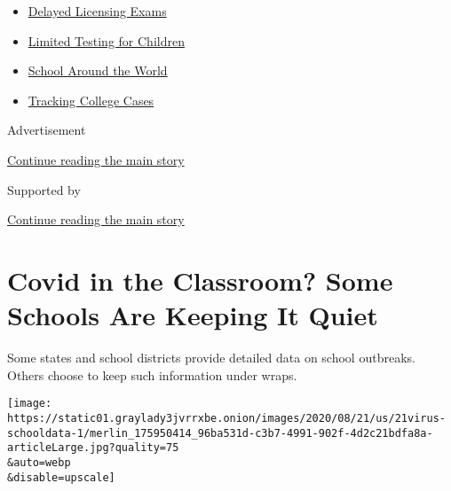 \begin{itemize}
\tightlist
\item
  \href{https://www.nytimes3xbfgragh.onion/2020/09/04/us/bar-exam-coronavirus.html?name=styln-coronavirus-schools-reopening\&region=TOP_BANNER\&block=storyline_menu_recirc\&action=click\&pgtype=Article\&impression_id=78b271e1-f299-11ea-a3f6-692f6f3812c0\&variant=undefined}{Delayed
  Licensing Exams}
\item
  \href{https://www.nytimes3xbfgragh.onion/2020/09/08/upshot/children-testing-shortfalls-virus.html?name=styln-coronavirus-schools-reopening\&region=TOP_BANNER\&block=storyline_menu_recirc\&action=click\&pgtype=Article\&impression_id=78b298f0-f299-11ea-a3f6-692f6f3812c0\&variant=undefined}{Limited
  Testing for Children}
\item
  \href{https://www.nytimes3xbfgragh.onion/2020/09/01/world/schools-reopen-globe-students.html?name=styln-coronavirus-schools-reopening\&region=TOP_BANNER\&block=storyline_menu_recirc\&action=click\&pgtype=Article\&impression_id=78b298f1-f299-11ea-a3f6-692f6f3812c0\&variant=undefined}{School
  Around the World}
\item
  \href{https://www.nytimes3xbfgragh.onion/interactive/2020/us/covid-college-cases-tracker.html?name=styln-coronavirus-schools-reopening\&region=TOP_BANNER\&block=storyline_menu_recirc\&action=click\&pgtype=Article\&impression_id=78b298f2-f299-11ea-a3f6-692f6f3812c0\&variant=undefined}{Tracking
  College Cases}
\end{itemize}

Advertisement

\protect\hyperlink{after-top}{Continue reading the main story}

Supported by

\protect\hyperlink{after-sponsor}{Continue reading the main story}

\hypertarget{covid-in-the-classroom-some-schools-are-keeping-it-quiet}{%
\section{Covid in the Classroom? Some Schools Are Keeping It
Quiet}\label{covid-in-the-classroom-some-schools-are-keeping-it-quiet}}

Some states and school districts provide detailed data on school
outbreaks. Others choose to keep such information under wraps.

\texttt{[image: https://static01.graylady3jvrrxbe.onion/images/2020/08/21/us/21virus-schooldata-1/merlin\_175950414\_96ba531d-c3b7-4991-902f-4d2c21bdfa8a-articleLarge.jpg?quality=75\\\&auto=webp\\\&disable=upscale]}

